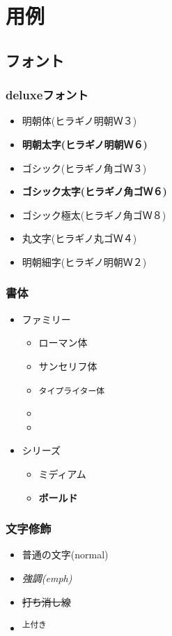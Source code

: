 \section{用例}
\subsection{フォント}

\subsubsection{deluxeフォント}
\begin{itemize}
  \item {\mcfamily 明朝体(ヒラギノ明朝Ｗ３)}
  \item {\mcfamily\bfseries 明朝太字(ヒラギノ明朝Ｗ６)}
  \item {\gtfamily ゴシック(ヒラギノ角ゴＷ３)}
  \item {\gtfamily\bfseries ゴシック太字(ヒラギノ角ゴＷ６)}
  \item {\gtfamily\ebseries ゴシック極太(ヒラギノ角ゴＷ８)}
  \item {\mgfamily 丸文字(ヒラギノ丸ゴＷ４)}
  \item {\mcfamily\ltseries 明朝細字(ヒラギノ明朝Ｗ２)}
\end{itemize}

\subsubsection{書体}
\begin{itemize}
  \item ファミリー
  \begin{itemize}
    \item \textrm{ローマン体}
    \item \textsf{サンセリフ体}
    \item \texttt{タイプライター体}
    \item {}
    \item {}
  \end{itemize}

  \item シリーズ
  \begin{itemize}
    \item \textmd{ミディアム}
    \item \textbf{ボールド}
  \end{itemize}
\end{itemize}

\subsubsection{文字修飾}
\begin{itemize}
\item 普通の文字(normal)
\item \emph{強調(emph)}
\item \sout{打ち消し線}
\item \textsuperscript{上付き}
\end{itemize}

